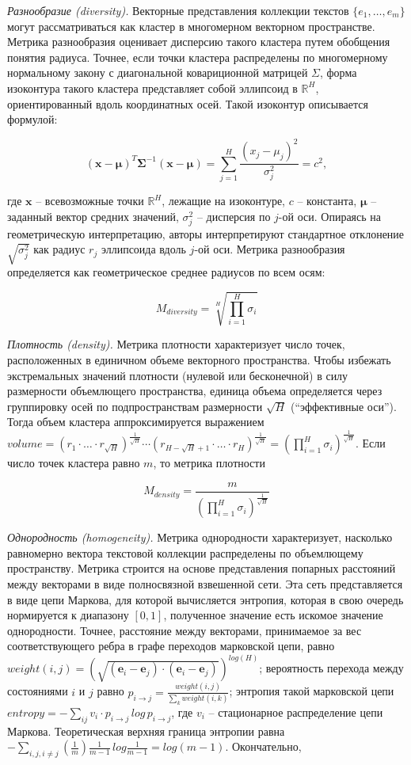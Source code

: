 \textit{Разнообразие (diversity).} Векторные представления коллекции текстов $\{e_1, \ldots, e_m\}$ могут рассматриваться как кластер в многомерном векторном пространстве. Метрика разнообразия оценивает дисперсию такого кластера путем обобщения понятия радиуса. Точнее, если точки кластера распределены по многомерному нормальному закону с диагональной ковариционной матрицей $\Sigma$, форма изоконтура такого кластера представляет собой эллипсоид в $\mathbb{R}^H$, ориентированный вдоль координатных осей. Такой изоконтур описывается формулой:

\[(\bm{x}-\bm{\mu})^T\bm{\Sigma}^{-1}(\bm{x}-\bm{\mu}) = \sum_{j=1}^{H}\frac{(x_j-\mu_j)^2}{\sigma_j^2} = c^2,\]

\noindent где $\bm{x}$ -- всевозможные точки $\mathbb{R}^H$, лежащие на изоконтуре, $c$ -- константа, $\bm{\mu}$ -- заданный вектор средних значений, $\sigma_j^2$ -- дисперсия по $j$-ой оси. Опираясь на геометрическую интерпретацию, авторы интерпретируют стандартное отклонение $\sqrt{\sigma_j^2}$  как радиус $r_j$ эллипсоида вдоль $j$-ой оси. Метрика разнообразия определяется как геометрическое среднее радиусов по всем осям: 

\[M_{diversity} = \sqrt[H]{\prod_{i=1}^{H}\sigma_i}\]

\textit{Плотность (density).} Метрика плотности характеризует число точек, расположенных в единичном объеме векторного пространства. Чтобы избежать экстремальных значений плотности (нулевой или бесконечной) в силу размерности объемлющего пространства, единица объема определяется через группировку осей по подпространствам размерности $\sqrt{H}$ (``эффективные оси''). Тогда объем кластера аппроксимируется выражением $volume = (r_1 \cdot \ldots \cdot r_{\sqrt{H}})^{\frac{1}{\sqrt{H}}} \cdots (r_{H-\sqrt{H}+1} \cdot \ldots \cdot r_{H})^{\frac{1}{\sqrt{H}}} = (\prod_{i=1}^{H}\sigma_i)^{\frac{1}{\sqrt{H}}}$. Если число точек кластера равно $m$, то метрика плотности

\[M_{density}=\frac{m}{(\prod_{i=1}^{H}\sigma_i)^{\frac{1}{\sqrt{H}}}}\]

\textit{Однородность (homogeneity).} Метрика однородности характеризует, насколько равномерно вектора текстовой коллекции распределены по объемлющему пространству. Метрика строится на основе представления попарных расстояний между векторами в виде полносвязной взвешенной сети. Эта сеть представляется в виде цепи Маркова, для которой вычисляется энтропия, которая в свою очередь нормируется к диапазону $[0, 1]$, полученное значение есть искомое значение однородности. Точнее, расстояние между векторами, принимаемое за вес соответствующего ребра в графе переходов марковской цепи, равно $weight(i,j) = (\sqrt{(\bm{e}_i - \bm{e}_j)\cdot(\bm{e}_i - \bm{e}_j)})^{log(H)}$; вероятность перехода между состояниями $i$ и $j$ равно $p_{i \to j} = \frac{weight(i, j)}{\sum_k weight(i,k)}$; энтропия такой марковской цепи $entropy= -\sum_{ij}v_i \cdot p_{i\to j}\,log\,p_{i\to j}$, где $v_i$ -- стационарное распределение цепи Маркова. Теоретическая верхняя граница энтропии равна $-\sum_{i,j,i\neq j}(\frac{1}{m})\frac{1}{m-1}\,log\frac{1}{m-1} = log(m-1)$. Окончательно,

